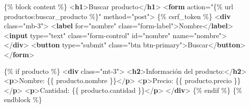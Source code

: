 \documentclass[
  a4paper,
  DIV=11,
  numbers=noendperiod,
  onepage,
  openany]{scrreprt}
\newenvironment{Shaded}{\begin{snugshade}}{\end{snugshade}}
\newcommand{\DataTypeTok}[1]{\textcolor[rgb]{0.68,0.00,0.00}{#1}}
\newcommand{\KeywordTok}[1]{\textcolor[rgb]{0.00,0.23,0.31}{\textbf{#1}}}
\newcommand{\NormalTok}[1]{\textcolor[rgb]{0.00,0.23,0.31}{#1}}
\newcommand{\OperatorTok}[1]{\textcolor[rgb]{0.37,0.37,0.37}{#1}}
\newcommand{\OtherTok}[1]{\textcolor[rgb]{0.00,0.23,0.31}{#1}}
\newcommand{\StringTok}[1]{\textcolor[rgb]{0.13,0.47,0.30}{#1}}
\begin{document}
\begin{tcolorbox}
\begin{Shaded}
\begin{Highlighting}[]
\NormalTok{\{\% block content \%\}}
\DataTypeTok{\textless{}}\KeywordTok{h1}\DataTypeTok{\textgreater{}}\NormalTok{Buscar producto}\DataTypeTok{\textless{}/}\KeywordTok{h1}\DataTypeTok{\textgreater{}}
\DataTypeTok{\textless{}}\KeywordTok{form}\OtherTok{ action}\OperatorTok{=}\StringTok{"\{\% url \textquotesingle{}productos:buscar\_producto\textquotesingle{} \%\}"}\OtherTok{ method}\OperatorTok{=}\StringTok{"post"}\DataTypeTok{\textgreater{}}
\NormalTok{    \{\% csrf\_token \%\}}
    \DataTypeTok{\textless{}}\KeywordTok{div}\OtherTok{ class}\OperatorTok{=}\StringTok{"mb{-}3"}\DataTypeTok{\textgreater{}}
        \DataTypeTok{\textless{}}\KeywordTok{label}\OtherTok{ for}\OperatorTok{=}\StringTok{"nombre"}\OtherTok{ class}\OperatorTok{=}\StringTok{"form{-}label"}\DataTypeTok{\textgreater{}}\NormalTok{Nombre}\DataTypeTok{\textless{}/}\KeywordTok{label}\DataTypeTok{\textgreater{}}
        \DataTypeTok{\textless{}}\KeywordTok{input}\OtherTok{ type}\OperatorTok{=}\StringTok{"text"}\OtherTok{ class}\OperatorTok{=}\StringTok{"form{-}control"}\OtherTok{ id}\OperatorTok{=}\StringTok{"nombre"}\OtherTok{ name}\OperatorTok{=}\StringTok{"nombre"}\DataTypeTok{\textgreater{}}
    \DataTypeTok{\textless{}/}\KeywordTok{div}\DataTypeTok{\textgreater{}}
    \DataTypeTok{\textless{}}\KeywordTok{button}\OtherTok{ type}\OperatorTok{=}\StringTok{"submit"}\OtherTok{ class}\OperatorTok{=}\StringTok{"btn btn{-}primary"}\DataTypeTok{\textgreater{}}\NormalTok{Buscar}\DataTypeTok{\textless{}/}\KeywordTok{button}\DataTypeTok{\textgreater{}}
\DataTypeTok{\textless{}/}\KeywordTok{form}\DataTypeTok{\textgreater{}}

\NormalTok{\{\% if producto \%\}}
\DataTypeTok{\textless{}}\KeywordTok{div}\OtherTok{ class}\OperatorTok{=}\StringTok{"mt{-}3"}\DataTypeTok{\textgreater{}}
    \DataTypeTok{\textless{}}\KeywordTok{h2}\DataTypeTok{\textgreater{}}\NormalTok{Información del producto:}\DataTypeTok{\textless{}/}\KeywordTok{h2}\DataTypeTok{\textgreater{}}
    \DataTypeTok{\textless{}}\KeywordTok{p}\DataTypeTok{\textgreater{}}\NormalTok{Nombre: \{\{ producto.nombre \}\}}\DataTypeTok{\textless{}/}\KeywordTok{p}\DataTypeTok{\textgreater{}}
    \DataTypeTok{\textless{}}\KeywordTok{p}\DataTypeTok{\textgreater{}}\NormalTok{Precio: \{\{ producto.precio \}\}}\DataTypeTok{\textless{}/}\KeywordTok{p}\DataTypeTok{\textgreater{}}
    \DataTypeTok{\textless{}}\KeywordTok{p}\DataTypeTok{\textgreater{}}\NormalTok{Cantidad: \{\{ producto.cantidad \}\}}\DataTypeTok{\textless{}/}\KeywordTok{p}\DataTypeTok{\textgreater{}}
\DataTypeTok{\textless{}/}\KeywordTok{div}\DataTypeTok{\textgreater{}}
\NormalTok{\{\% endif \%\}}
\NormalTok{\{\% endblock \%\}}
\end{Highlighting}
\end{Shaded}


\end{tcolorbox}
\end{document}
